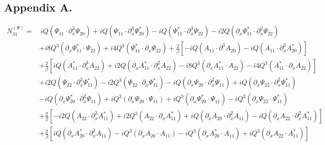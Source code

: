 \documentclass{emulateapj}
\newcommand{\beq}{\begin{equation}}
\newcommand{\eeq}{\end{equation}}
\begin{document}
\newpage
\begin{appendices}
\begin{widetext}
\section*{Appendix A.}

\beq
\begin{split}
N_{31}^{(\Psi)} = &  \, i Q \left(\Psi_{11} \cdot \partial_x^3 \Psi_{20}\right) + i Q \left(\Psi_{11} \cdot \partial_x^3\Psi_{20}^*\right) - i Q \left(\Psi_{11}^* \cdot \partial_x^3 \Psi_{22}\right) - i 2 Q \left(\partial_x \Psi_{11}^* \cdot \partial_x^2 \Psi_{22}\right) \\
& + i 8 Q^3 \left(\partial_x\Psi_{11}^* \cdot \Psi_{22}\right) + i 4 Q^3 \left(\Psi_{11}^* \cdot \partial_x \Psi_{22}\right) + \frac{2}{\beta}\left[ - i Q \left(A_{11} \cdot \partial^3 A_{20}\right) - i Q \left(A_{11} \cdot \partial_x^3 A_{20}^*\right) \right]\\
& + \frac{2}{\beta}\left[i Q \left(A_{11}^* \cdot \partial_x^3 A_{22}\right) + i 2 Q \left(\partial_x A_{11}^* \cdot \partial_x^2 A_{22}\right) - i 8 Q^3 \left(\partial_x A_{11}^* \cdot A_{22}\right) - i 4 Q^3 \left(A_{11}^* \cdot \partial_x A_{22}\right)\right] \\
& + i 2 Q \left(\Psi_{22} \cdot \partial_x^3 \Psi_{11}^*\right) - i 2 Q^3\left(\Psi_{22} \cdot \partial_x \Psi_{11}^* \right) - i Q \left(\partial_x \Psi_{20} \cdot \partial_x^2 \Psi_{11}\right) + i Q \left(\partial_x \Psi_{22} \cdot \partial_x^2 \Psi_{11}^*\right) \\
& - i Q \left(\partial_x \Psi_{20}^* \cdot \partial_x^2 \Psi_{11}\right) + i Q^3 \left(\partial_x \Psi_{20} \cdot \Psi_{11}\right) + i Q^3 \left(\partial_x \Psi_{20}^* \cdot \Psi_{11}\right) - i Q^3 \left(\partial_x \Psi_{22} \cdot \Psi_{11}^*\right) \\
& + \frac{2}{\beta} \left[ - i 2 Q \left(A_{22} \cdot \partial_x^3 A_{11}^*\right) + i 2 Q^3 \left(A_{22} \cdot \partial_x A_{11}^*\right) + i Q \left(\partial_x A_{20} \cdot \partial_x^2 A_{11}\right) - i Q \left(\partial_x A_{22} \cdot \partial_x^2 A_{11}^*\right) \right] \\
& + \frac{2}{\beta} \left[ i Q \left(\partial_x A_{20}^* \cdot \partial_x^2 A_{11}\right) - i Q^3 \left(\partial_x A_{20} \cdot A_{11}\right) - i Q^3 \left(\partial_x A_{20}^* \cdot A_{11}\right) + i Q^3 \left(\partial_x A_{22} \cdot A_{11}^*\right)\right]
\end{split}
\eeq


\end{widetext}
\end{appendices}
\end{document}
